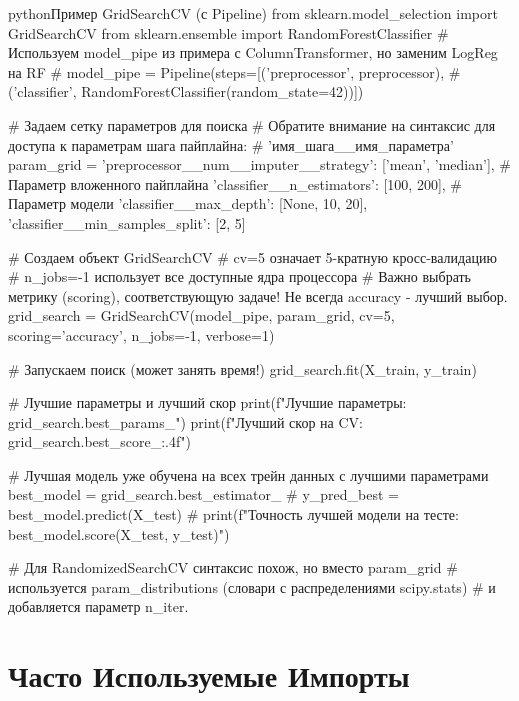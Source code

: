 \begin{codebox}{python}{Пример GridSearchCV (с Pipeline)}
from sklearn.model_selection import GridSearchCV
from sklearn.ensemble import RandomForestClassifier
# Используем model_pipe из примера с ColumnTransformer, но заменим LogReg на RF
# model_pipe = Pipeline(steps=[('preprocessor', preprocessor),
#                            ('classifier', RandomForestClassifier(random_state=42))])

# Задаем сетку параметров для поиска
# Обратите внимание на синтаксис для доступа к параметрам шага пайплайна:
# 'имя_шага__имя_параметра'
param_grid = {
    'preprocessor__num__imputer__strategy': ['mean', 'median'], # Параметр вложенного пайплайна
    'classifier__n_estimators': [100, 200], # Параметр модели
    'classifier__max_depth': [None, 10, 20],
    'classifier__min_samples_split': [2, 5]
}

# Создаем объект GridSearchCV
# cv=5 означает 5-кратную кросс-валидацию
# n_jobs=-1 использует все доступные ядра процессора
# Важно выбрать метрику (scoring), соответствующую задаче! Не всегда accuracy - лучший выбор.
grid_search = GridSearchCV(model_pipe, param_grid, cv=5, scoring='accuracy', n_jobs=-1, verbose=1)

# Запускаем поиск (может занять время!)
grid_search.fit(X_train, y_train)

# Лучшие параметры и лучший скор
print(f"Лучшие параметры: {grid_search.best_params_}")
print(f"Лучший скор на CV: {grid_search.best_score_:.4f}")

# Лучшая модель уже обучена на всех трейн данных с лучшими параметрами
best_model = grid_search.best_estimator_
# y_pred_best = best_model.predict(X_test)
# print(f"Точность лучшей модели на тесте: {best_model.score(X_test, y_test)}")

# Для RandomizedSearchCV синтаксис похож, но вместо param_grid
# используется param_distributions (словари с распределениями scipy.stats)
# и добавляется параметр n_iter.
\end{codebox}

\section{Часто Используемые Импорты}

